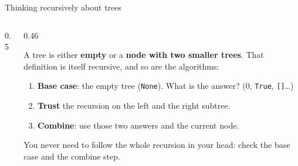 \documentclass[aspectratio=169,10pt]{beamer}
\begin{document}
\begin{frame}{Thinking recursively about trees}
\begin{columns}[T]
\begin{column}{0.5\textwidth}
\begin{sfig}[0.7]
\end{sfig}
\end{column}
\begin{column}{0.46\textwidth}
{\small
A tree is either \textbf{empty} or a \textbf{node with two smaller trees}. That definition is itself recursive, and so are the algorithms:
\begin{enumerate}\setlength\itemsep{3pt}
\item \textbf{Base case}: the empty tree (\texttt{None}). What is the answer? ($0$, \texttt{True}, \texttt{[]}\ldots)
\item \textbf{Trust} the recursion on the left and the right subtree.
\item \textbf{Combine}: use those two answers and the current node.
\end{enumerate}
\vspace{1mm}
You never need to follow the whole recursion in your head: check the base case and the combine step.}
\end{column}
\end{columns}
\end{frame}
\end{document}
